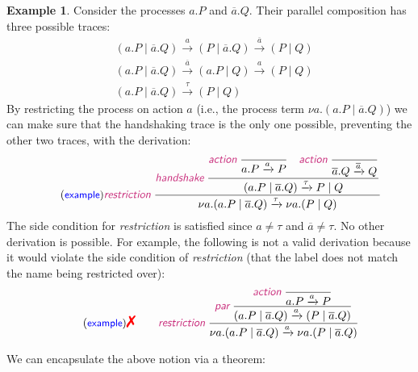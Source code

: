 \documentclass{article}
\newcommand{\exampleLabel}{\tag{\small{\textcolor{blue}{\textsf{example}}}}}
\theoremstyle{definition}
\newtheorem{example}{Example}
\newcommand{\dual}[1]{\overline{#1}}
\newcommand{\trule}[1]{\textcolor{labelColor}{\textit{\textsf{#1}}}\;}
\begin{document}
\begin{example}
  Consider the processes $a . P$ and $\overline{a} . Q$.
  Their parallel composition has three possible traces:
  \begin{align*}
    & (a . P \mid \overline{a} . Q) \xrightarrow{a}
    (P \mid \overline{a} . Q) \xrightarrow{\overline{a}}
    (P \mid Q) \\
    & (a . P \mid \overline{a} . Q) \xrightarrow{\overline{a}}
    (a.P \mid Q) \xrightarrow{a}
      (P \mid Q) \\
    & (a . P \mid \overline{a} . Q) \xrightarrow{\tau}
      (P \mid Q)
   \end{align*}
   By restricting the process on action $a$ (i.e., the process term
   $\nu a . (a . P \mid \overline{a} . Q)$) we can make sure that the
   handshaking trace is the only one possible, preventing the other two traces, with
   the derivation:
   \begin{align*}
          \exampleLabel{}
     \trule{restriction}\dfrac{
     \trule{handshake}
     \dfrac{
       \trule{action}\dfrac{}{a . P \xrightarrow{a} P}
       \quad
       \trule{action}\dfrac{}{\overline{a} . Q \xrightarrow{\overline{a}} Q}
     }{(a . P \mid \overline{a} . Q) \xrightarrow{\tau} P \mid Q}
     }{\nu a . (a . P \mid \overline{a} . Q) \xrightarrow{\tau} \nu a
     . (P \mid Q)}
   \end{align*}
   The side condition for \trule{restriction} is satisfied since
   $a \neq \tau$ and $\dual{a} \neq \tau$. No other derivation is
   possible. For example, the following is not a valid derivation
   because it would violate the side condition of \trule{restriction}
   (that the label does not match the name being restricted over):
   \begin{align*}
     \exampleLabel{}
     {\Large{{\textcolor{red}{\text{\ding{55}}}}}} \qquad
     \trule{restriction}\dfrac{
     \trule{par}
     \dfrac{
       \trule{action}\dfrac{}{a . P \xrightarrow{a} P}
      }{(a . P \mid \overline{a} . Q) \xrightarrow{a} (P \mid
  \overline{a} . Q)}
     }{\nu a . (a . P \mid \overline{a} . Q) \xrightarrow{a} \nu a
     . (P \mid \dual{a} . Q)}
   \end{align*}
\end{example}
%
We can encapsulate the above notion via a theorem:
%
\end{document}
